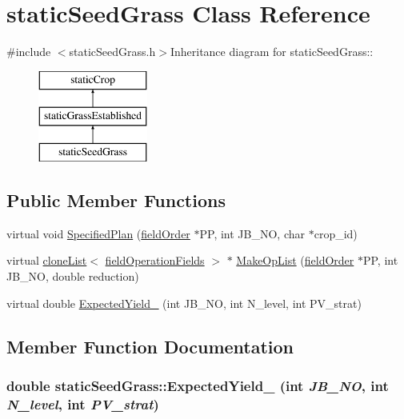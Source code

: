 \hypertarget{classstatic_seed_grass}{
\section{staticSeedGrass Class Reference}
\label{classstatic_seed_grass}
}


{\ttfamily \#include $<$staticSeedGrass.h$>$}Inheritance diagram for staticSeedGrass::\begin{figure}[H]
\begin{center}
\leavevmode
\includegraphics[height=3cm]{classstatic_seed_grass}
\end{center}
\end{figure}
\subsection*{Public Member Functions}
\begin{DoxyCompactItemize}
\item 
virtual void \hyperlink{classstatic_seed_grass_a816b9db700be83fb80b143e80c63286e}{SpecifiedPlan} (\hyperlink{classfield_order}{fieldOrder} $\ast$PP, int JB\_\-NO, char $\ast$crop\_\-id)
\item 
virtual \hyperlink{classclone_list}{cloneList}$<$ \hyperlink{classfield_operation_fields}{fieldOperationFields} $>$ $\ast$ \hyperlink{classstatic_seed_grass_a33e78ba847a76de09f30b7eb4ff88a68}{MakeOpList} (\hyperlink{classfield_order}{fieldOrder} $\ast$PP, int JB\_\-NO, double reduction)
\item 
virtual double \hyperlink{classstatic_seed_grass_a193ffe602d2fe2f7169956688bb06fdb}{ExpectedYield\_\-} (int JB\_\-NO, int N\_\-level, int PV\_\-strat)
\end{DoxyCompactItemize}


\subsection{Member Function Documentation}
\hypertarget{classstatic_seed_grass_a193ffe602d2fe2f7169956688bb06fdb}{
\subsubsection[{ExpectedYield\_\-}]{\setlength{\rightskip}{0pt plus 5cm}double staticSeedGrass::ExpectedYield\_\- (int {\em JB\_\-NO}, \/  int {\em N\_\-level}, \/  int {\em PV\_\-strat})}}
\label{classstatic_seed_grass_a193ffe602d2fe2f7169956688bb06fdb}


